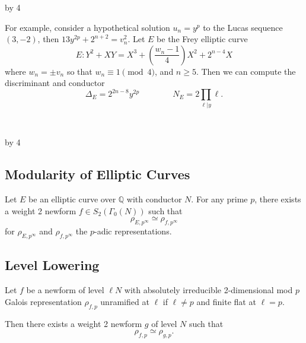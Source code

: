 \documentclass[12pt]{scrartcl}
\def\Q{{\mathbb Q}}
\def\anzspalten{4}
\newlength{\kastenwidth}
\newenvironment{kasten}{%
  \begin{lrbox}{\dummybox}%
    \begin{minipage}{0.96\linewidth}}%
    {\end{minipage}%
  \end{lrbox}%
  \raisebox{-\depth}{\psshadowbox[framesep=1em]{\usebox{\dummybox}}}\\[0.5em]}
\newenvironment{spalte}{%
  \setlength\kastenwidth{1.2\textwidth}
  \divide\kastenwidth by \anzspalten
  \begin{minipage}[t]{\kastenwidth}}{\end{minipage}\hfill}
\begin{document}
\begin{lrbox}{\spalten}
{\begin{spalte}
\begin{kasten}
For example, consider a hypothetical solution $u_n = y^p$ to the Lucas sequence $(3,-2)$, then $13y^{2p} + 2^{n+2} = v_n^2$.
Let $E$ be the Frey elliptic curve
\[ E: Y^2 + XY = X^3 + \left(\frac{w_n-1}{4} \right)X^2 + 2^{n-4}X \]
where $w_n = \pm v_n$ so that $w_n \equiv 1 \pmod{4}$, and $n \geq 5$.  Then we can compute the discriminant and conductor
\[ \Delta_E = 2^{2n-8}y^{2p} \qquad \qquad N_E = 2 \prod_{\ell | y} \ell. \]

\end{kasten}


\end{spalte}
    \begin{spalte}




\begin{kasten}

\subsection*{\color{blue} Modularity of Elliptic Curves}

Let $E$ be an elliptic curve over $\Q$ with conductor $N$.  For any prime $p$, there exists a weight 2 newform $f \in S_2(\Gamma_0(N))$ such that
\[ \rho_{E,p^{\infty}} \simeq \rho_{f,p^{\infty}} \]
for $\rho_{E,p^\infty}$ and $\rho_{f,p^\infty}$ the $p$-adic representations. 

\subsection*{\color{blue} Level Lowering}

Let $f$ be a newform of level $\ell N$ with absolutely irreducible 2-dimensional mod $p$ Galois representation $\rho_{f,p}$ unramified at $\ell$ if $\ell \neq p$ and finite flat at $\ell = p$. 

 Then there exists a weight 2 newform $g$ of level $N$ such that
 \vspace{-10pt}
\[ \rho_{f,p} \simeq \rho_{g,p}. \]

\end{kasten}




\end{spalte}}
\end{lrbox}
\end{document}
